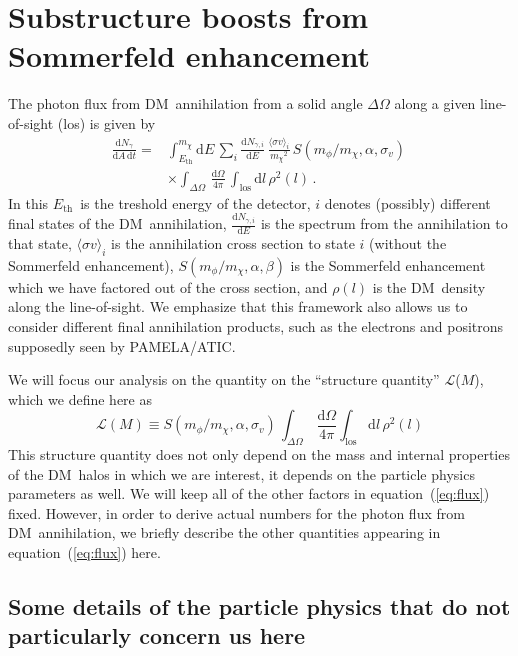 \documentclass[aps,prd,twocolumn,amsmath,amssymb,floatfix,nofootinbib,10pt]{revtex4}
\newcommand{\DM}{DM}
\newcommand{\somm}{\ensuremath{S}}
\newcommand{\mdm}{\ensuremath{m_{\chi}}}
\newcommand{\mv}{\ensuremath{m_{\phi}}}
\newcommand{\dd}{\mathrm{d}}
\newcommand{\eqnname}{equation}
\newcommand{\Ngamma}{\ensuremath{N_{\gamma}}}
\newcommand{\Ngammai}{\ensuremath{N_{\gamma,i}}}
\newcommand{\Eth}{\ensuremath{E_{\mathrm{th}}}}
\newcommand{\sigmaannv}{\ensuremath{\langle\sigma v\rangle}}
\newcommand{\los}{los}
\newcommand{\sigv}{\ensuremath{\sigma_v}}
\newcommand{\lum}{\ensuremath{\mathcal{L}}}
\begin{document}
\section{Substructure boosts from Sommerfeld enhancement}
The photon flux from \DM\ annihilation from a solid angle
$\Delta\Omega$ along a given line-of-sight (\los) is given by
\begin{equation}\label{eq:flux}
\begin{split}
\frac{\dd \Ngamma}{\dd A \,\dd t}  = &
\int_{\Eth}^{\mdm}\dd E\, \sum_i \frac{\dd
\Ngammai}{\dd E} \,\frac{\sigmaannv_i}{\mdm^2}\,
\somm\left(\mv/\mdm,\alpha,\sigv\right)\,\\
& \times \int_{\Delta\Omega}\,\frac{\dd\Omega}{4\pi}\,\int_{\mathrm{\los}} \dd l\,
\rho^2(l)\, .
\end{split}
\end{equation}
In this \Eth\ is the treshold energy of the detector, $i$ denotes
(possibly) different final states of the \DM\ annihilation, $\frac{\dd
\Ngammai}{\dd E}$ is the spectrum from the annihilation to that state,
$\sigmaannv_i$ is the annihilation cross section to state $i$ (without
the Sommerfeld enhancement), $\somm\left(\mv/\mdm,\alpha,\beta\right)$
is the Sommerfeld enhancement which we have factored out of the cross
section, and $\rho(l)$ is the \DM\ density along the line-of-sight. We
emphasize that this framework also allows us to consider different
final annihilation products, such as the electrons and positrons
supposedly seen by PAMELA/ATIC.


We will focus our analysis on the quantity on the ``structure quantity''
\lum($M$), which we define here as
\begin{equation}\label{eq:structquant}
\lum(M)\equiv\somm\left(\mv/\mdm,\alpha,\sigv\right)\,\int_{\Delta\Omega}\,\frac{\dd\Omega}{4\pi}\int_{\mathrm{\los}}
\dd l\, \rho^2(l)
\end{equation}
This structure quantity does not only depend on the mass and internal
properties of the \DM\ halos in which we are interest, it depends on
the particle physics parameters as well. We will keep all of the other
factors in \eqnname\ (\ref{eq:flux}) fixed. However, in order to
derive actual numbers for the photon flux from \DM\ annihilation, we
briefly describe the other quantities appearing in \eqnname\
(\ref{eq:flux}) here.

\subsection{Some details of the particle physics that do not particularly concern us here}\label{sec:partphys}
\end{document}
